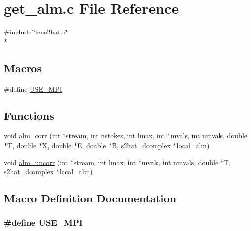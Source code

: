 \section{get\-\_\-alm.\-c File Reference}
\label{displacement__test__nersc_2get__alm_8c}
{\ttfamily \#include \char`\"{}lens2hat.\-h\char`\"{}}\\*
\subsection*{Macros}
\begin{DoxyCompactItemize}
\item 
\#define \hyperlink{displacement__test__nersc_2get__alm_8c_a3869d282031f6ea6b50fdb980b758420}{U\-S\-E\-\_\-\-M\-P\-I}
\end{DoxyCompactItemize}
\subsection*{Functions}
\begin{DoxyCompactItemize}
\item 
void \hyperlink{displacement__test__nersc_2get__alm_8c_a80f1d7977e804f028cad6821ef147f4b}{alm\-\_\-corr} (int $\ast$stream, int nstokes, int lmax, int $\ast$mvals, int nmvals, double $\ast$T, double $\ast$X, double $\ast$E, double $\ast$B, s2hat\-\_\-dcomplex $\ast$local\-\_\-alm)
\item 
void \hyperlink{displacement__test__nersc_2get__alm_8c_a58e31a888c3017dccbcf950b073dd2e9}{alm\-\_\-uncorr} (int $\ast$stream, int lmax, int $\ast$mvals, int nmvals, double $\ast$T, s2hat\-\_\-dcomplex $\ast$local\-\_\-alm)
\end{DoxyCompactItemize}


\subsection{Macro Definition Documentation}
\subsubsection[{U\-S\-E\-\_\-\-M\-P\-I}]{\setlength{\rightskip}{0pt plus 5cm}\#define U\-S\-E\-\_\-\-M\-P\-I}\label{displacement__test__nersc_2get__alm_8c_a3869d282031f6ea6b50fdb980b758420}


